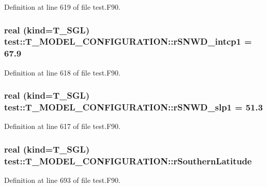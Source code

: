 Definition at line 619 of file test.F90.

\hypertarget{typetest_1_1_t___m_o_d_e_l___c_o_n_f_i_g_u_r_a_t_i_o_n_a5c3a99eb4e409f00ba7874a60b219d1f}{
\subsubsection[{rSNWD\_\-intcp1}]{\setlength{\rightskip}{0pt plus 5cm}real (kind={\bf T\_\-SGL}) {\bf test::T\_\-MODEL\_\-CONFIGURATION::rSNWD\_\-intcp1} = 67.9}}
\label{typetest_1_1_t___m_o_d_e_l___c_o_n_f_i_g_u_r_a_t_i_o_n_a5c3a99eb4e409f00ba7874a60b219d1f}


Definition at line 618 of file test.F90.

\hypertarget{typetest_1_1_t___m_o_d_e_l___c_o_n_f_i_g_u_r_a_t_i_o_n_a7cafed9b61b82ca974bda6ad565d632d}{
\subsubsection[{rSNWD\_\-slp1}]{\setlength{\rightskip}{0pt plus 5cm}real (kind={\bf T\_\-SGL}) {\bf test::T\_\-MODEL\_\-CONFIGURATION::rSNWD\_\-slp1} = 51.3}}
\label{typetest_1_1_t___m_o_d_e_l___c_o_n_f_i_g_u_r_a_t_i_o_n_a7cafed9b61b82ca974bda6ad565d632d}


Definition at line 617 of file test.F90.

\hypertarget{typetest_1_1_t___m_o_d_e_l___c_o_n_f_i_g_u_r_a_t_i_o_n_ae5b4331c980a9a71eb40710a3cd325cb}{
\subsubsection[{rSouthernLatitude}]{\setlength{\rightskip}{0pt plus 5cm}real (kind={\bf T\_\-SGL}) {\bf test::T\_\-MODEL\_\-CONFIGURATION::rSouthernLatitude}}}
\label{typetest_1_1_t___m_o_d_e_l___c_o_n_f_i_g_u_r_a_t_i_o_n_ae5b4331c980a9a71eb40710a3cd325cb}


Definition at line 693 of file test.F90.

